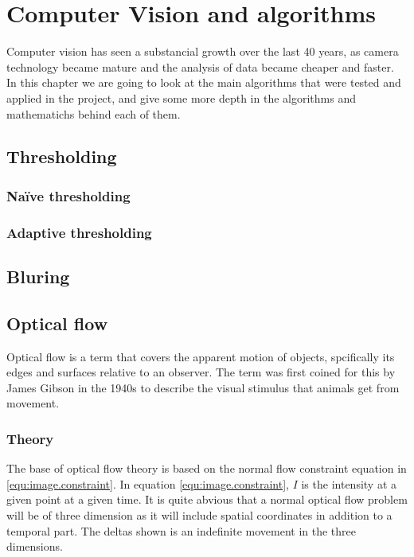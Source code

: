 
\chapter{Computer Vision and algorithms}

Computer vision has seen a substancial growth over the last 40 years, as camera technology became mature 
and the analysis of data became cheaper and faster. In this chapter we are going to look at the main algorithms 
that were tested and applied in the project, and give some more depth in the algorithms and mathematichs behind each of them.

\section{Thresholding}

\subsection{Naïve thresholding}

\subsection{Adaptive thresholding}


\section{Bluring}



\section{Optical flow}
Optical flow is a term that covers the apparent motion of objects, spcifically its edges and surfaces 
relative to an observer. The term was first coined for this by James Gibson in the 1940s 
to describe the visual stimulus that animals get from movement\citet{gibson50}.


\subsection{Theory}
The base of optical flow theory is based on the normal flow constraint equation in \eqref{equ:image.constraint}. In equation \eqref{equ:image.constraint}, $I$ is the intensity
at a given point at a given time. It is quite abvious that a normal optical flow problem will be of three dimension as it will include spatial coordinates in addition
to a temporal part. The deltas shown is an indefinite movement in the three dimensions.


